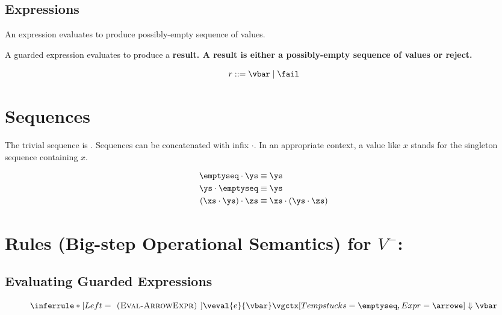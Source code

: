 \documentclass[]{article}
\begin{document}
    
    
    
    
    
\subsection{Expressions}

    
    An expression evaluates to produce possibly-empty sequence of values.

    A guarded expression evaluates to produce a \bf{result}. A result is either
    a possibly-empty sequence of values or reject. 

    \[\it{r} \; \rm{::=} \; \vbar \;|\; \fail \]


\bigskip


\section{Sequences}

The trivial sequence is \emptyseq. Sequences can be concatenated with infix 
$\cdot$. In an appropriate context, a value like $x$ stands for 
the singleton sequence containing $x$. 

\begin{align*}
    \emptyseq \cdot \ys &\equiv \ys \\
    \ys \cdot \emptyseq &\equiv \ys \\
    (\xs \cdot \ys) \cdot \zs &\equiv \xs \cdot (\ys \cdot \zs)
\end{align*}

\section{Rules (Big-step Operational Semantics) for $V^{-}$:}
    
\subsection{Evaluating Guarded Expressions}

\[
\inferrule*[Left=\textsc{ (Eval-ArrowExpr) }]
    {\veval{e}{\vbar}}
    {\vgctx[Tempstucks=\emptyseq, Expr=\arrowe] 
    \Downarrow \vbar}
\]
\end{document}
